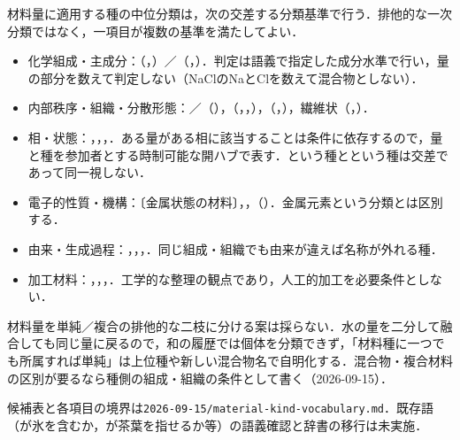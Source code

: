 \documentclass[../../main-detail.tex]{subfiles}
\begin{document}
材料量に適用する種の中位分類は，次の交差する分類基準で行う．排他的な一次分類ではなく，一項目が複数の基準を満たしてよい．
\begin{itemize}
  \item 化学組成・主成分：（，）／（，）．判定は語義で指定した成分水準で行い，量の部分を数えて判定しない（NaClのNaとClを数えて混合物としない）．
  \item 内部秩序・組織・分散形態：／（），（，，），（，），繊維状（，）．
  \item 相・状態：，，，．ある量がある相に該当することは条件に依存するので，量と種を参加者とする時制可能な開ハブで表す．という種とという種は交差であって同一視しない．
  \item 電子的性質・機構：〔金属状態の材料〕，，（）．金属元素という分類とは区別する．
  \item 由来・生成過程：，，，．同じ組成・組織でも由来が違えば名称が外れる種．
  \item 加工材料：，，，．工学的な整理の観点であり，人工的加工を必要条件としない．
\end{itemize}
\begin{whynot}
材料量を単純／複合の排他的な二枝に分ける案は採らない．水の量を二分して融合しても同じ量に戻るので，和の履歴では個体を分類できず，「材料種に一つでも所属すれば単純」は上位種や新しい混合物名で自明化する．混合物・複合材料の区別が要るなら種側の組成・組織の条件として書く（2026-09-15）．
\end{whynot}
候補表と各項目の境界は\texttt{2026-09-15/material-kind-vocabulary.md}．既存語（が氷を含むか，が茶葉を指せるか等）の語義確認と辞書の移行は未実施．
\end{document}
